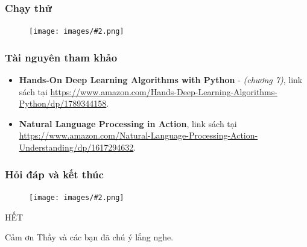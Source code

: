 \documentclass[aspectratio=169]{beamer}
\newcommand{\includeImage}[3]{
\begin{figure}[H]
    \centering
    \texttt{[image: images/\#2.png]}
    \def\temp{#3}\ifx\temp\empty\else\caption{#3}\fi
\end{figure}}
\newcommand{\twiceIndent}{\hspace{\parindent}}
\begin{document}

\begin{frame}
    \frametitle{Chạy thử}
    \includeImage{0.5}{demo}{}
\end{frame}

\begin{frame}
    \frametitle{Tài nguyên tham khảo}
    \begin{itemize}
        \item \textbf{\color{teal} Hands-On Deep Learning Algorithms with Python} - \textit{(chương 7)}, link sách tại \href{https://www.amazon.com/Hands-Deep-Learning-Algorithms-Python/dp/1789344158}{\color{blue} https://www.amazon.com/Hands-Deep-Learning-Algorithms-Python/dp/1789344158}.
        \item \textbf{\color{teal} Natural Language Processing in Action}, link sách tại \href{https://www.amazon.com/Natural-Language-Processing-Action-Understanding/dp/1617294632}{\color{blue} https://www.amazon.com/Natural-Language-Processing-Action-Understanding/dp/1617294632}. 
    \end{itemize}
\end{frame}

\begin{frame}
    \frametitle{Hỏi đáp và kết thúc}
    \includeImage{0.5}{ask_and_answer}{}
\end{frame}

\begin{frame}
    \Huge{\centerline{HẾT}}
    \Large{\centerline{Cảm ơn Thầy và các bạn đã chú ý lắng nghe.}}
\end{frame}

\end{document}
